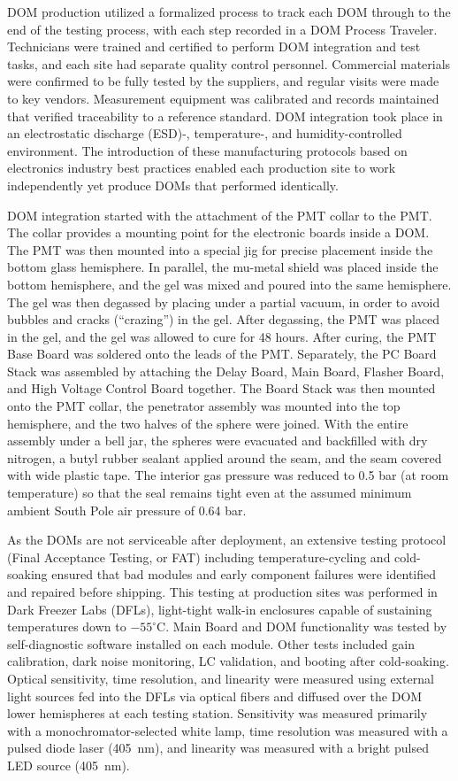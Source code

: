 DOM production utilized a formalized process to track each DOM through to
the end of the testing process, with each step recorded in a DOM Process
Traveler.  Technicians were trained and certified to perform DOM
integration and test tasks, and each site had separate quality control
personnel. Commercial materials were confirmed to be fully tested by the
suppliers, and regular visits were made to key vendors.  Measurement
equipment was calibrated and records maintained that verified
traceability to a reference standard.  DOM integration took place in
an electrostatic discharge (ESD)-, temperature-, and humidity-controlled environment.  The introduction
of these manufacturing protocols based on electronics industry best
practices enabled each production site to work independently yet
produce DOMs that performed identically.

DOM integration started with the attachment of the PMT collar
to the PMT.  The collar provides a mounting point for the electronic boards inside
a DOM. The PMT was then mounted into a special jig for precise
placement inside the bottom glass hemisphere.  In parallel, the mu-metal
shield was placed inside the bottom hemisphere, and the
gel was mixed and poured into the same hemisphere. The gel was then
degassed by placing under a partial vacuum, in order to avoid bubbles and
cracks (``crazing'') in the gel. 
After degassing, the PMT was placed in the gel, and the gel was allowed to
cure for 48 hours.  After curing, the PMT Base Board was soldered onto the
leads of the 
PMT.  Separately, the PC Board Stack was assembled by attaching the Delay
Board, Main Board, Flasher Board, and High Voltage Control Board together.
The Board Stack was then mounted onto the PMT collar, the penetrator assembly
was mounted into the top hemisphere, and the two halves of the sphere were
joined.  With the entire assembly under a bell jar, the spheres were
evacuated and backfilled with dry nitrogen, 
a butyl rubber sealant applied around the seam, and the seam covered with
wide plastic tape. The interior gas pressure was reduced to 0.5 bar (at
room temperature) so that the seal remains tight even at the assumed minimum
ambient South Pole air pressure of 0.64 bar.

As the DOMs are not serviceable after deployment, an extensive testing
protocol (Final Acceptance Testing, or FAT) including temperature-cycling
and cold-soaking ensured that bad modules and early component failures were
identified and repaired before shipping.  This testing at production sites
was performed in Dark Freezer Labs (DFLs), light-tight walk-in 
enclosures capable of sustaining temperatures down to $-55^\circ$C.  Main Board
and DOM functionality was tested by self-diagnostic software installed on
each module.  Other tests included gain calibration, dark noise monitoring,
LC validation, and booting after cold-soaking.  Optical sensitivity, time resolution,
and linearity were measured using external light sources fed into the DFLs
via optical fibers and diffused over the DOM lower hemispheres at each
testing station. Sensitivity was measured primarily with a
monochromator-selected white lamp, time resolution was measured with a
pulsed diode laser (405~nm), and linearity was measured with a bright
pulsed LED source (405~nm).


